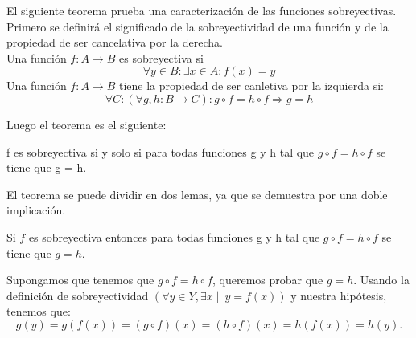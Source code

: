 %
\begin{isabellebody}%
%
%
\isadelimtheory
\isanewline
%
\endisadelimtheory
%
\isatagtheory
%
\endisatagtheory
{\isafoldtheory}%
%
\isadelimtheory
%
\endisadelimtheory
%
\begin{isamarkuptext}%
%
\end{isamarkuptext}\isamarkuptrue%
%
\begin{isamarkuptext}%
%
\end{isamarkuptext}\isamarkuptrue%
%
\begin{isamarkuptext}%
%
\end{isamarkuptext}\isamarkuptrue%
%
\isadelimdocument
%
\endisadelimdocument
%
\isatagdocument
%
\isamarkuptrue%
%
\endisatagdocument
{\isafolddocument}%
%
\isadelimdocument
%
\endisadelimdocument
%
\begin{isamarkuptext}%
El siguiente teorema prueba una caracterización de las funciones
 sobreyectivas. Primero se definirá el significado de la sobreyectividad
de una función y de la propiedad de ser cancelativa por la derecha. \\
Una función $f : A \longrightarrow B$ es sobreyectiva si 
$$\forall y \in B : \exists x \in A : f(x) = y$$
Una función $f : A \longrightarrow B$ tiene la propiedad de ser
 canletiva por la izquierda si: 
$$\forall C : (\forall g,h: B \longrightarrow C) : g \circ f = h \circ f
\Longrightarrow g = h$$

Luego el teorema es el siguiente: 

\begin {teorema}
  f es sobreyectiva si y solo si  para todas funciones g y h tal que 
$g \circ f  = h \circ f$ se tiene que g = h.
\end {teorema}
 
El teorema se puede dividir en dos lemas, ya que  se
 demuestra por una doble implicación.

\begin {lema}
 Si $f$ es sobreyectiva entonces  para todas funciones g y h tal que 
$g \circ f = h \circ f$ se tiene que $g = h$.
\end {lema}

\begin {demostracion}
Supongamos que tenemos que $g \circ  f = h \circ f$, queremos
 probar que $g = h.$ Usando la definición de sobreyectividad
 $(\forall y \in Y,  \exists x \| y = f(x))$ y nuestra hipótesis,
 tenemos que: $$g(y) = g(f(x)) = (g \circ f) (x) = (h \circ f) (x) =
 h(f(x)) = h(y).$$
\end {demostracion}


\end{isamarkuptext}
\end{isabellebody}

